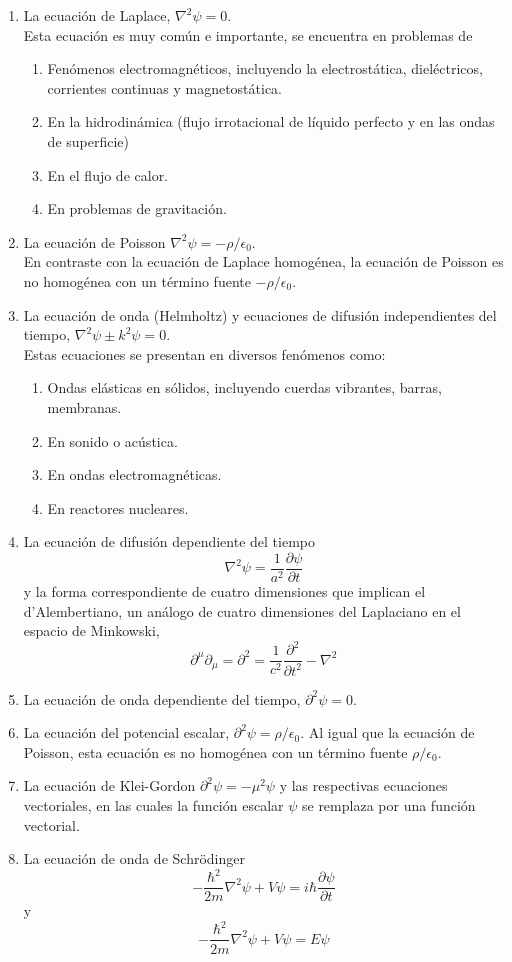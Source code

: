 \begin{enumerate}
\item La ecuación de Laplace, $\nabla^{2} \psi = 0$. 
\\
Esta ecuación es muy común e importante, se encuentra en problemas de
\begin{enumerate}
\item Fenómenos electromagnéticos, incluyendo la electrostática, dieléctricos, corrientes continuas y magnetostática.
\item En la hidrodinámica (flujo irrotacional de líquido perfecto y en las ondas de superficie)
\item En el flujo de calor.
\item En problemas de gravitación.
\end{enumerate}
\item La ecuación de Poisson $\nabla^{2} \psi = - \rho / \epsilon_{0}$.
\\
En contraste con la ecuación de Laplace homogénea, la ecuación de Poisson es no homogénea con un término fuente $- \rho / \epsilon_{0}$.
\item La ecuación de onda (Helmholtz) y ecuaciones de difusión independientes del tiempo, $\nabla^{2} \psi \pm k^{2} \psi= 0$.
\\
Estas ecuaciones se presentan en diversos fenómenos como:
\begin{enumerate}
\item Ondas elásticas en sólidos, incluyendo cuerdas vibrantes, barras, membranas.
\item En sonido o acústica.
\item En ondas electromagnéticas.
\item En reactores nucleares.
\end{enumerate}
\item La ecuación de difusión dependiente del tiempo
\[ \nabla^{2} \psi = \dfrac{1}{a^{2}} \dfrac{\partial \psi}{\partial t} \]
y la forma correspondiente de cuatro dimensiones que implican el d'Alembertiano, un análogo de cuatro dimensiones del Laplaciano en el espacio de Minkowski,
\[ \partial^{\mu} \partial_{\mu} = \partial^{2} = \dfrac{1}{c^{2}} \dfrac{\partial^{2}}{\partial t^{2}} - \nabla^{2} \]
\item La ecuación de onda dependiente del tiempo, $\partial^{2} \psi = 0$.
\item La ecuación del potencial escalar, $\partial^{2} \psi = \rho / \epsilon_{0}$. Al igual que la ecuación de Poisson, esta ecuación es no homogénea con un término fuente $\rho / \epsilon_{0}$.
\item La ecuación de Klei-Gordon $\partial^{2} \psi = - \mu^{2} \psi$ y las respectivas ecuaciones vectoriales, en las cuales la función escalar $\psi$ se remplaza por una función vectorial.
\item La ecuación de onda de Schrödinger
\[ - \dfrac{\hbar^{2}}{2m} \nabla^{2} \psi +  V \psi =  i \hbar \dfrac{\partial \psi}{\partial t} \]
y
\[ - \dfrac{\hbar^{2}}{2m} \nabla^{2} \psi +  V \psi =  E \psi \]
\end{enumerate}
